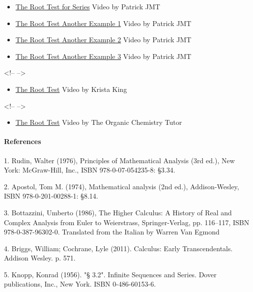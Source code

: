 \begin{itemize}
    \item \href{https://www.youtube.com/watch?v=vDdDLfIya0I}{The Root Test for Series} Video by Patrick JMT
    \item \href{https://www.youtube.com/watch?v=nTfJCbqHyxI}{The Root Test Another Example 1} Video by Patrick JMT
    \item \href{https://www.youtube.com/watch?v=s2ox6IuKiX0}{The Root Test Another Example 2} Video by Patrick JMT
    \item \href{https://www.youtube.com/watch?v=wo4c4NYIiIo}{The Root Test Another Example 3} Video by Patrick JMT
\end{itemize}

<!-- -->



\begin{itemize}
    \item \href{https://www.youtube.com/watch?v=pSvQaiqTajk}{The Root Test} Video by Krista King
\end{itemize}

<!-- -->



\begin{itemize}
    \item \href{https://www.youtube.com/watch?v=ahf0eXOll1M}{The Root Test} Video by The Organic Chemistry Tutor
\end{itemize}

\paragraph{References}



1.  Rudin, Walter (1976), Principles of Mathematical Analysis (3rd ed.), New York: McGraw-Hill, Inc., ISBN 978-0-07-054235-8: §3.34.

2.  Apostol, Tom M. (1974), Mathematical analysis (2nd ed.), Addison-Wesley, ISBN 978-0-201-00288-1: §8.14.

3.  Bottazzini, Umberto (1986), The Higher Calculus: A History of Real and Complex Analysis from Euler to Weierstrass, Springer-Verlag, pp. 116--117, ISBN 978-0-387-96302-0. Translated from the Italian by Warren Van Egmond

4.  Briggs, William; Cochrane, Lyle (2011). Calculus: Early Transcendentals. Addison Wesley. p. 571.

5.  Knopp, Konrad (1956). "§ 3.2". Infinite Sequences and Series. Dover publications, Inc., New York. ISBN 0-486-60153-6.

